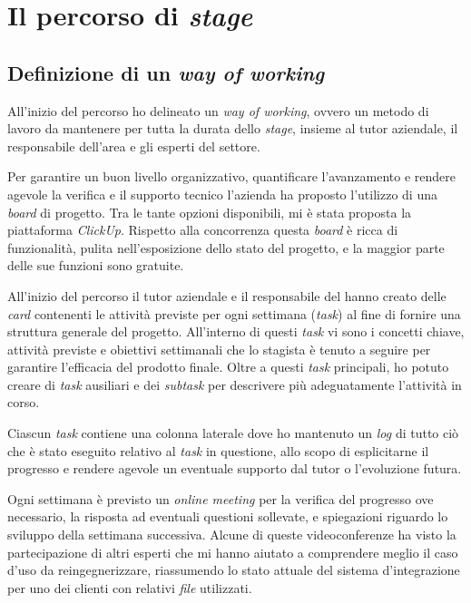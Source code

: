 \chapter{Il percorso di \textit{stage}}


\section{Definizione di un \textit{way of working}}

All'inizio del percorso ho delineato un \textit{way of working}, ovvero un metodo di lavoro da mantenere per tutta la durata dello \textit{stage}, insieme al tutor aziendale, il responsabile dell'area  e gli esperti del settore.

Per garantire un buon livello organizzativo, quantificare l'avanzamento e rendere agevole la verifica e il supporto tecnico l'azienda ha proposto l'utilizzo di una \textit{board} di progetto.
Tra le tante opzioni disponibili, mi è stata proposta la piattaforma \textit{ClickUp}.
Rispetto alla concorrenza questa \textit{board} è ricca di funzionalità, pulita nell'esposizione dello stato del progetto, e la maggior parte delle sue funzioni sono gratuite.

All'inizio del percorso il tutor aziendale e il responsabile del  hanno creato delle \textit{card} contenenti le attività previste per ogni settimana (\textit{task}) al fine di fornire una struttura generale del progetto.
All'interno di questi \textit{task} vi sono i concetti chiave, attività previste e obiettivi settimanali che lo stagista è tenuto a seguire per garantire l'efficacia del prodotto finale.
Oltre a questi \textit{task} principali, ho potuto creare di \textit{task} ausiliari e dei \textit{subtask} per descrivere più adeguatamente l'attività in corso.

Ciascun \textit{task} contiene una colonna laterale dove ho mantenuto un \textit{log} di tutto ciò che è stato eseguito relativo al \textit{task} in questione, allo scopo di esplicitarne il progresso e rendere agevole un eventuale supporto dal tutor o l'evoluzione futura.

Ogni settimana è previsto un \textit{online meeting} per la verifica del progresso ove necessario, la risposta ad eventuali questioni sollevate, e spiegazioni riguardo lo sviluppo della settimana successiva.
Alcune di queste videoconferenze ha visto la partecipazione di altri esperti che mi hanno aiutato a comprendere meglio il caso d'uso da reingegnerizzare, riassumendo lo stato attuale del sistema d'integrazione per uno dei clienti con relativi \textit{file} utilizzati.

